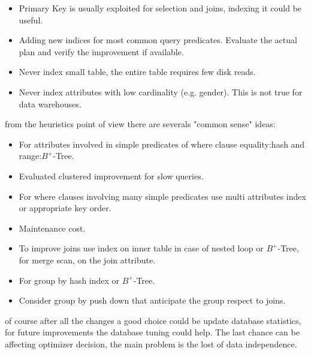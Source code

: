 \documentclass[12pt]{article}
\begin{document}
\begin{itemize}
  \item Primary Key is usually exploited for selection and joins, indexing it could be useful.
  \item Adding new indices for most common query predicates. Evaluate the actual plan and verify the improvement if available.
  \item Never index small table, the entire table requires few disk reads.
  \item Never index attributes with low cardinality (e.g. gender). This is not true for data warehouses.
\end{itemize}
from the heuristics point of view there are severals "common sense" ideas:
\begin{itemize}
  \item For attributes involved in simple predicates of where clause equality:hash and range:$B^{+}$-Tree.
  \item Evaluated clustered improvement for slow queries.
  \item For where clauses involving many simple predicates use multi attributes index or appropriate key order.
  \item Maintenance cost.
  \item To improve joins use index on inner table in case of nested loop or $B^{+}$-Tree, for merge scan, on the join attribute.
  \item For group by hash index or $B^{+}$-Tree.
  \item Consider group by push down that anticipate the group respect to joins.
\end{itemize}
of course after all the changes a good choice could be update database statistics, for future improvements the database tuning could help. The last chance can be affecting optimizer decision, the main problem is the lost of data independence.
\end{document}
